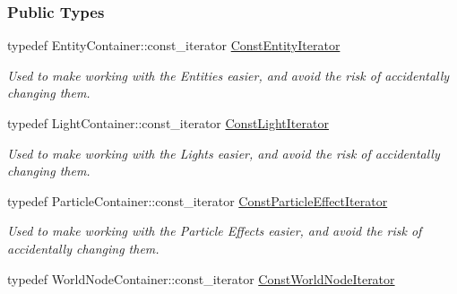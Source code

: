\subsubsection*{Public Types}
\begin{DoxyCompactItemize}
\item 
\hypertarget{classMezzanine_1_1SceneManager_a6837ab4cd75f30af8159f18db973e497}{
typedef EntityContainer::const\_\-iterator \hyperlink{classMezzanine_1_1SceneManager_a6837ab4cd75f30af8159f18db973e497}{ConstEntityIterator}}
\label{classMezzanine_1_1SceneManager_a6837ab4cd75f30af8159f18db973e497}

\begin{DoxyCompactList}\small\item\em Used to make working with the Entities easier, and avoid the risk of accidentally changing them. \item\end{DoxyCompactList}\item 
\hypertarget{classMezzanine_1_1SceneManager_a04a257d3df126110aa545e856853a663}{
typedef LightContainer::const\_\-iterator \hyperlink{classMezzanine_1_1SceneManager_a04a257d3df126110aa545e856853a663}{ConstLightIterator}}
\label{classMezzanine_1_1SceneManager_a04a257d3df126110aa545e856853a663}

\begin{DoxyCompactList}\small\item\em Used to make working with the Lights easier, and avoid the risk of accidentally changing them. \item\end{DoxyCompactList}\item 
\hypertarget{classMezzanine_1_1SceneManager_ab1213cec08b0bc15ea58ed0d3617b887}{
typedef ParticleContainer::const\_\-iterator \hyperlink{classMezzanine_1_1SceneManager_ab1213cec08b0bc15ea58ed0d3617b887}{ConstParticleEffectIterator}}
\label{classMezzanine_1_1SceneManager_ab1213cec08b0bc15ea58ed0d3617b887}

\begin{DoxyCompactList}\small\item\em Used to make working with the Particle Effects easier, and avoid the risk of accidentally changing them. \item\end{DoxyCompactList}\item 
\hypertarget{classMezzanine_1_1SceneManager_ad60b6e15daa2395944d395b4e307b905}{
typedef WorldNodeContainer::const\_\-iterator \hyperlink{classMezzanine_1_1SceneManager_ad60b6e15daa2395944d395b4e307b905}{ConstWorldNodeIterator}}
\label{classMezzanine_1_1SceneManager_ad60b6e15daa2395944d395b4e307b905}


\end{DoxyCompactItemize}
